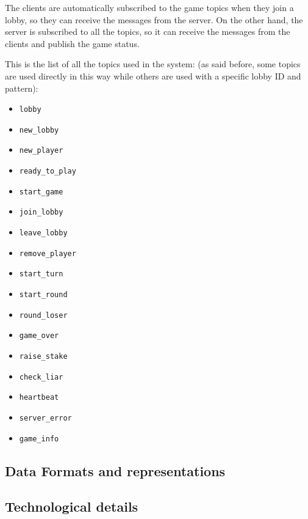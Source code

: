 \documentclass{scrartcl}
\begin{document}
The clients are automatically subscribed to the game topics when they join a lobby, so they can 
receive the messages from the server. On the other hand, the server is subscribed to all the topics, 
so it can receive the messages from the clients and publish the game status.

This is the list of all the topics used in the system: (as said before, some topics are used directly 
in this way while others are used with a specific lobby ID and pattern):
\begin{itemize}
      \item \texttt{lobby}
      \item \texttt{new\_lobby}
      \item \texttt{new\_player}
      \item \texttt{ready\_to\_play}
      \item \texttt{start\_game}
      \item \texttt{join\_lobby}
      \item \texttt{leave\_lobby}
      \item \texttt{remove\_player}
      \item \texttt{start\_turn}
      \item \texttt{start\_round}
      \item \texttt{round\_loser}
      \item \texttt{game\_over}
      \item \texttt{raise\_stake}
      \item \texttt{check\_liar}
      \item \texttt{heartbeat}
      \item \texttt{server\_error}
      \item \texttt{game\_info}
\end{itemize}

\subsection{Data Formats and representations}\label{data-formats}


\subsection{Technological details}\label{technological-details}

\end{document}
